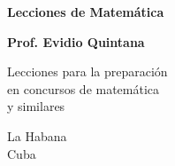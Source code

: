 \begin{titlepage}
    \begin{center}
        \vspace*{1cm}
        
        \Huge
        \textbf{Lecciones de Matemática}
        
        \vspace{0.5cm}
        \LARGE
        
    
        \textbf{Prof. Evidio Quintana}
        
        \vfill
        
        Lecciones para la preparación\\
        en concursos de matemática\\
        y similares
    
        
      
        \vfill
        
        \Large
        La Habana\\
        Cuba\\
        \vspace{1.0cm}
        
    \end{center}
    
\end{titlepage}